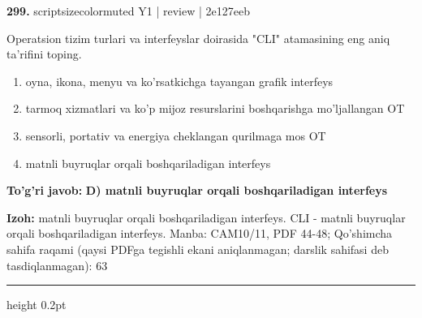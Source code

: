 \documentclass[10pt,a4paper]{article}
\begin{document}
{\bfseries\sffamily\color{ink} 299.} {scriptsizecolor{muted} Y1 | review | 2e127eeb}
\par
Operatsion tizim turlari va interfeyslar doirasida "CLI" atamasining eng aniq ta'rifini toping.
\begin{enumerate}[label=\Alph*),leftmargin=9mm]
\item oyna, ikona, menyu va ko'rsatkichga tayangan grafik interfeys
\item tarmoq xizmatlari va ko'p mijoz resurslarini boshqarishga mo'ljallangan OT
\item sensorli, portativ va energiya cheklangan qurilmaga mos OT
\item matnli buyruqlar orqali boshqariladigan interfeys
\end{enumerate}
\begin{tcolorbox}[enhanced,breakable,colback=teal!4,colframe=teal!60!black,boxrule=0.45pt,arc=1.2mm,left=2.7mm,right=2.7mm,top=1.8mm,bottom=1.8mm,before skip=2mm,after skip=2mm]
{\bfseries\sffamily\color{teal}To'g'ri javob:} \textbf{D) matnli buyruqlar orqali boshqariladigan interfeys}
\par\smallskip
{\bfseries Izoh:} matnli buyruqlar orqali boshqariladigan interfeys. CLI - matnli buyruqlar orqali boshqariladigan interfeys. Manba: CAM10/11, PDF 44-48; Qo'shimcha sahifa raqami (qaysi PDFga tegishli ekani aniqlanmagan; darslik sahifasi deb tasdiqlanmagan): 63
\end{tcolorbox}
\vspace{2mm}\hrule height 0.2pt\vspace{3mm}
\end{document}

